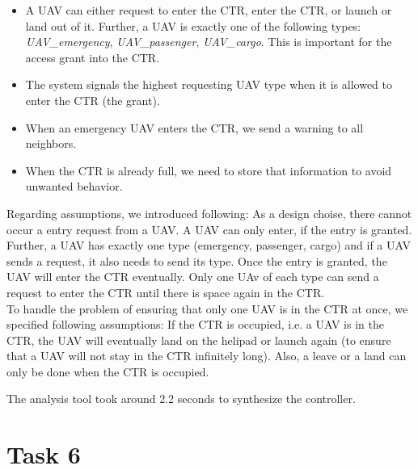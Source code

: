 \documentclass[	runningheads,
				a4paper]{llncs}
\begin{document}
\begin{itemize}
    \item A UAV can either request to enter the CTR, enter the CTR, or launch or land out of it. Further, a UAV is exactly one of the following types: \textit{UAV\_emergency}, \textit{UAV\_passenger}, \textit{UAV\_cargo}. This is important for the access grant into the CTR.
    \item The system signals the highest requesting UAV type when it is allowed to enter the CTR (the grant).
    \item When an emergency UAV enters the CTR, we send a warning to all neighbors.
    \item When the CTR is already full, we need to store that information to avoid unwanted behavior.
\end{itemize}

Regarding assumptions, we introduced following: As a design choise, there cannot occur a entry request from a UAV. A UAV can only enter, if the entry is granted. Further, a UAV has exactly one type (emergency, passenger, cargo) and if a UAV sends a request, it also needs to send its type. Once the entry is granted, the UAV will enter the CTR eventually. Only one UAv of each type can send a request to enter the CTR until there is space again in the CTR.\\
To handle the problem of ensuring that only one UAV is in the CTR at once, we specified following assumptions: If the CTR is occupied, i.e. a UAV is in the CTR, the UAV will eventually land on the helipad or launch again (to ensure that a UAV will not stay in the CTR infinitely long). Also, a leave or a land can only be done when the CTR is occupied. 




The analysis tool took around 2.2 seconds to synthesize the controller.


\section{Task 6}








	
\end{document}
